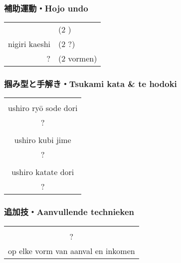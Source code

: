 \subsubsection{補助運動・Hojo undo}
\begin{table}[H]
\begin{center}
\begin{tabular}{rl}
    \ruby{}{} & (2 \ruby{}{})\\
    nigiri kaeshi & (2 ?)\\
    ? & (2 vormen)
\end{tabular}
\end{center}
\label{kyuu_2_hojo_undo}
\end{table}

\subsubsection{掴み型と手解き・Tsukami kata \& te hodoki}
\begin{table}[H]
\begin{center}
\begin{tabular}{c}
    \ruby{}{}\ruby{}{}\\
    ushiro ry\={o} sode dori\\
    ?\\
    \hline
    \ruby{}{}\\
    ushiro kubi jime\\
    ?\\
    \hline
    \ruby{}{}\\
    ushiro katate dori\\
    ?
\end{tabular}
\end{center}
\label{kyuu_2_te_hodoki}
\end{table}

\subsubsection{追加技・Aanvullende technieken}
\begin{table}[H]
\begin{center}
\begin{tabular}{c}
    \ruby{}{}\\
    ?\\
    op elke vorm van aanval en inkomen
\end{tabular}
\end{center}
\label{kyuu_2_additional}
\end{table}


